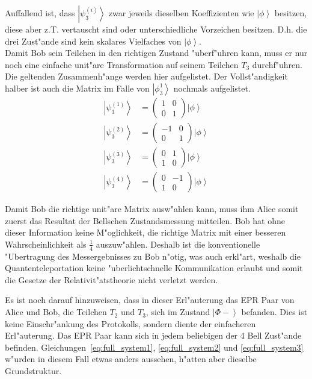 \begin{refsection}
\begin{center}
\begin{tabular}{| l | c |}
    \end{tabular}
\end{center}
Auffallend ist, dass $\left| \psi_{3}^{(i)} \right\rangle$ zwar jeweils dieselben Koeffizienten wie $\left| \phi \right\rangle$ besitzen, diese aber z.T. vertauscht sind oder unterschiedliche Vorzeichen besitzen. D.h. die drei Zust"ande sind kein skalares Vielfaches von $\left| \phi \right\rangle$.
\\
Damit Bob sein Teilchen in den richtigen Zustand "uberf"uhren kann, muss er nur noch eine einfache unit"are Transformation auf seinem Teilchen $T_{3}$ durchf"uhren. Die geltenden Zusammenh"ange werden hier aufgelistet. Der Vollst"andigkeit halber ist auch die Matrix im Falle von $\left|\phi_{3}^{1}\right\rangle$ nochmals aufgelistet.
\begin{align}
	\left| \psi_{3}^{(1)} \right \rangle & = \begin{pmatrix} 1 & 0 \\ 0 & 1 \end{pmatrix} \left| \phi \right \rangle \\
	\left| \psi_{3}^{(2)} \right \rangle & = \begin{pmatrix} -1 & 0 \\ 0 & 1 \end{pmatrix} \left| \phi \right \rangle \\
	\left| \psi_{3}^{(3)} \right \rangle & = \begin{pmatrix} 0 & 1 \\ 1 & 0 \end{pmatrix} \left| \phi \right \rangle \\
	\left| \psi_{3}^{(4)} \right \rangle & = \begin{pmatrix} 0 & -1 \\ 1 & 0 \end{pmatrix} \left| \phi \right \rangle
\end{align}

Damit Bob die richtige unit"are Matrix ausw"ahlen kann, muss ihm Alice somit zuerst das Resultat der Bellschen Zustandsmessung mitteilen. Bob hat ohne dieser Information keine M"oglichkeit, die richtige Matrix mit einer besseren Wahrscheinlichkeit als $\frac{1}{4}$ auszuw"ahlen. Deshalb ist die konventionelle "Ubertragung des Messergebnisses zu Bob n"otig, was auch erkl"art, weshalb die  Quantenteleportation keine "uberlichtschnelle Kommunikation erlaubt und somit die Gesetze der Relativit"atstheorie nicht verletzt werden.

Es ist noch darauf hinzuweisen, dass in dieser Erl"auterung das EPR Paar von Alice und Bob, die Teilchen $T_{2}$ und $T_{3}$, sich im Zustand $\left| \Phi{-} \right\rangle$ befanden. Dies ist keine Einschr"ankung des Protokolls, sondern diente der einfacheren Erl"auterung. Das EPR Paar kann sich in jedem beliebigen der 4 Bell Zust"ande befinden. Gleichungen~\ref{eq:full_system1}, \ref{eq:full_system2} und \ref{eq:full_system3} w"urden in diesem Fall etwas anders aussehen, h"atten aber dieselbe Grundstruktur.


\end{refsection}
